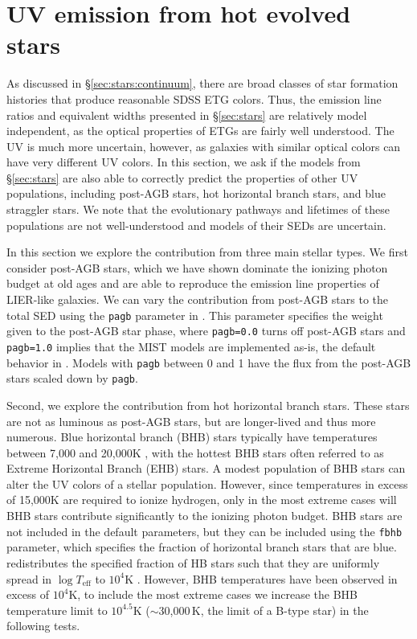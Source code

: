
\section{UV emission from hot evolved stars}\label{sec:colors}

As discussed in \S\ref{sec:stars:continuum}, there are broad classes of star formation histories that produce reasonable SDSS ETG colors. Thus, the emission line ratios and equivalent widths presented in \S\ref{sec:stars} are relatively model independent, as the optical properties of ETGs are fairly well understood. The UV is much more uncertain, however, as galaxies with similar optical colors can have very different UV colors. In this section, we ask if the models from \S\ref{sec:stars} are also able to correctly predict the properties of other UV populations, including post-AGB stars, hot horizontal branch stars, and blue straggler stars. We note that the evolutionary pathways and lifetimes of these populations are not well-understood and models of their SEDs are uncertain.

In this section we explore the contribution from three main stellar types. We first consider post-AGB stars, which we have shown dominate the ionizing photon budget at old ages and are able to reproduce the emission line properties of LIER-like galaxies. We can vary the contribution from post-AGB stars to the total SED using the {\tt pagb} parameter in \FSPS. This parameter specifies the weight given to the post-AGB star phase, where {\tt pagb=0.0} turns off post-AGB stars and {\tt pagb=1.0} implies that the MIST models are implemented as-is, the default behavior in \FSPS. Models with {\tt pagb} between 0 and 1 have the flux from the post-AGB stars scaled down by {\tt pagb}.

Second, we explore the contribution from hot horizontal branch stars. These stars are not as luminous as post-AGB stars, but are longer-lived and thus more numerous. Blue horizontal branch (BHB) stars typically have temperatures between 7,000 and 20,000K \citep{Schiavon+2004}, with the hottest BHB stars often referred to as Extreme Horizontal Branch (EHB) stars. A modest population of BHB stars can alter the UV colors of a stellar population. However, since temperatures in excess of 15,000K are required to ionize hydrogen, only in the most extreme cases will BHB stars contribute significantly to the ionizing photon budget. BHB stars are not included in the default \FSPS parameters, but they can be included using the {\tt fbhb} parameter, which specifies the fraction of horizontal branch stars that are blue. \FSPS redistributes the specified fraction of HB stars such that they are uniformly spread in $\log T_{\mathrm{eff}}$ to $10^4$K \citep[e.g.,][]{Sarajedini+2007}. However, BHB temperatures have been observed in excess of $10^4$K, to include the most extreme cases we increase the BHB temperature limit to $10^{4.5}$K (${\sim}$30,000$\,$K, the limit of a B-type star) in the following tests.

